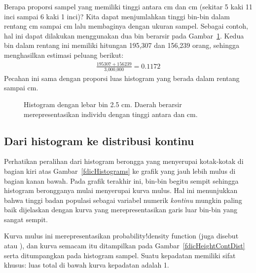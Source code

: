 \begin{examplewrap}
\begin{nexample}{Berapa proporsi sampel yang memiliki tinggi antara  cm dan  cm (sekitar 5 kaki 11 inci sampai 6 kaki 1 inci)?}\label{contDistProb}
Kita dapat menjumlahkan tinggi bin-bin dalam rentang  cm sampai  cm lalu membaginya dengan ukuran sampel. Sebagai contoh, hal ini dapat dilakukan menggunakan dua bin berarsir pada Gambar~\ref{usHeightsHist180185}. Kedua bin dalam rentang ini memiliki hitungan 195,307 dan 156,239 orang, sehingga menghasilkan estimasi peluang berikut:
\begin{align*}
\frac{195307 + 156239}{\text{3,000,000}} = 0.1172
\end{align*}
Pecahan ini sama dengan proporsi luas histogram yang berada dalam rentang  sampai  cm.
\end{nexample}
\end{examplewrap}

\begin{figure}[h]
  \centering
  \caption{Histogram dengan lebar bin 2.5 cm.
      Daerah berarsir merepresentasikan individu dengan
      tinggi antara  dan  cm.}
  \label{usHeightsHist180185}
\end{figure}


\D{\newpage}

\subsection{Dari histogram ke distribusi kontinu}

Perhatikan peralihan dari histogram berongga yang menyerupai kotak-kotak di bagian kiri atas Gambar~\ref{fdicHistograms} ke grafik yang jauh lebih mulus di bagian kanan bawah. Pada grafik terakhir ini, bin-bin begitu sempit sehingga histogram berongganya mulai menyerupai kurva mulus. Hal ini menunjukkan bahwa tinggi badan populasi sebagai variabel numerik \emph{kontinu} mungkin paling baik dijelaskan dengan kurva yang merepresentasikan garis luar bin-bin yang sangat sempit.

Kurva mulus ini merepresentasikan
    {probability!density function}
(juga disebut  atau ), dan kurva semacam itu ditampilkan pada Gambar~\ref{fdicHeightContDist} serta ditumpangkan pada histogram sampel. Suatu kepadatan memiliki sifat khusus: luas total di bawah kurva kepadatan adalah 1.

